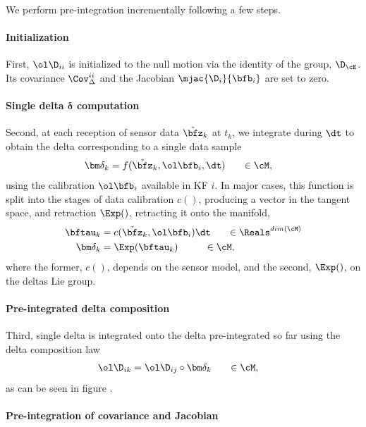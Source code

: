 We perform pre-integration incrementally following a few steps. 

\paragraph{Initialization}
First, $\ol\D_{ii}$ is initialized to the null motion via the identity of the group, $\D_{\cE}$. 
Its covariance $\Cov_\Delta^{ii}$ and the Jacobian $\mjac{\D_i}{\bfb_i}$ are set to zero. 

\paragraph{Single delta $\bm\delta$ computation}
Second, at each reception of sensor data $\tilde\bfz_k$ at $t_k$, we integrate during $\dt$ to obtain the delta corresponding to a single data sample
%
\begin{align}
    \bm\delta_k &= f(\tilde\bfz_k, \ol\bfb_i, \dt)  ~~~~~\in \cM, 
    \label{eq:data2delta}
\end{align}
%
using the calibration $\ol\bfb_i$ available in KF $i$. 
In major cases, this function is split into the stages of data calibration $c()$, producing a vector in the tangent space, and retraction $\Exp()$, retracting it onto the manifold,
%
\begin{align}
    \bftau_k &= c(\tilde\bfz_k, \ol\bfb_i) \dt ~~~~~\in \Reals^{dim(\cM)}\\
    \bm\delta_k &= \Exp(\bftau_k) ~~~~~~~~\in \cM,
\end{align}
%
where the former, $c()$, depends on the sensor model, and the second, $\Exp()$, on the deltas Lie group.

\paragraph{Pre-integrated delta composition}
Third, single delta is integrated onto the delta pre-integrated so far using the delta composition law
%
\begin{align}
    \ol\D_{ik} &= \ol\D_{ij} \circ \bm\delta_k ~~~~~\in \cM,
    \label{eq:deltaPlusDelta}
\end{align}
%
as can be seen in figure .


\paragraph{Pre-integration of covariance and Jacobian}

